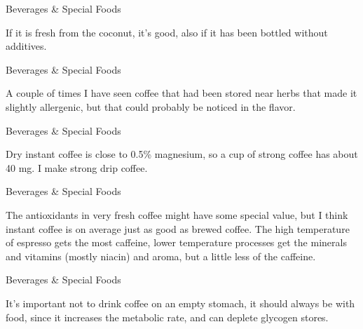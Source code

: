 \documentclass[11pt,oneside,openany,extrafontsizes]{memoir}
\begin{document}
\begin{standalonequote}{Beverages \& Special Foods}

    \begin{answer}
        If it is fresh from the coconut, it's good, also if it has been bottled without additives.
    \end{answer}
\end{standalonequote}

\begin{standalonequote}{Beverages \& Special Foods}

    \begin{answer}
        A couple of times I have seen coffee that had been stored near herbs that made it slightly allergenic, but that could probably be noticed in the flavor.
    \end{answer}
\end{standalonequote}

\begin{standalonequote}{Beverages \& Special Foods}

    \begin{answer}
        Dry instant coffee is close to 0.5\% magnesium, so a cup of strong coffee has about 40 mg. I make strong drip coffee.
    \end{answer}
\end{standalonequote}

\begin{standalonequote}{Beverages \& Special Foods}

    \begin{answer}
        The antioxidants in very fresh coffee might have some special value, but I think instant coffee is on average just as good as brewed coffee. The high temperature of espresso gets the most caffeine, lower temperature processes get the minerals and vitamins (mostly niacin) and aroma, but a little less of the caffeine.
    \end{answer}
\end{standalonequote}

\begin{standalonequote}{Beverages \& Special Foods}

    \begin{answer}
        It's important not to drink coffee on an empty stomach, it should always be with food, since it increases the metabolic rate, and can deplete glycogen stores.
    \end{answer}
\end{standalonequote}
\end{document}
